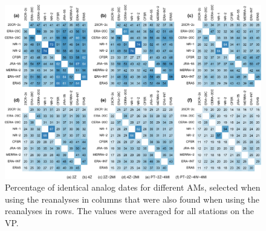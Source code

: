 \documentclass[alpha-refs]{wiley-article}
\begin{document}
\begin{figure}[bt]
	\centering
	\includegraphics[width=120mm]{figure-5.pdf}
	\caption{Percentage of identical analog dates for different AMs, selected when using the reanalyses in columns that were also found when using the reanalyses in rows. The values were averaged for all stations on the VP.}
	\label{fig:shared-dates}
\end{figure}
\end{document}
